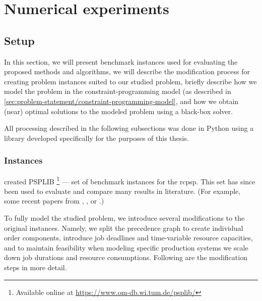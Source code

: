 \chapter{Numerical experiments} \label{chap:numerical-experiments}

\section{Setup} \label{sec:numerical-experiments/setup}

In this section, we will present benchmark instances used for evaluating the proposed methods and algorithms,
we will describe the modification process for creating problem instances suited to our studied problem,
briefly describe how we model the problem in the constraint-programming model
(as described in \cref{sec:problem-statement/constraint-programming-model},
and how we obtain (near) optimal solutions to the modeled problem using a black-box solver.

All processing described in the following subsections was done in Python using a library
developed specifically for the purposes of this thesis. 

\subsection{Instances} \label{subsec:numerical-experiments/setup/instances}

\citet{Kolisch1997} created PSPLIB%
\footnote{Available online at \url{https://www.om-db.wi.tum.de/psplib/}}
--- set of benchmark instances for the \ac{rcpsp}.
This set has since been used to evaluate and compare many results in literature.
(For example, some recent papers from \citet{Bianco2011}, \citet{Cheng2015}, or \citet{Elsayed2017}.)


To fully model the studied problem, we introduce several modifications to the original instances.
Namely, we split the precedence graph to create individual order components,
introduce job deadlines and time-variable resource capacities,
and to maintain feasibility when modeling specific production systems
we scale down job durations and resource consumptions.
Following are the modification steps in more detail.

